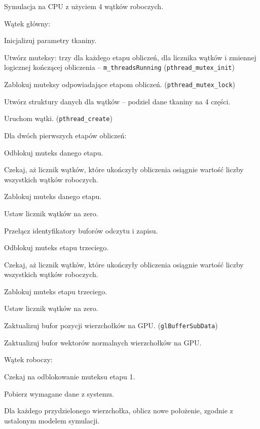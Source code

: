 		\begin{algorithm}
			\label{alg_5_3}
			\caption{Symulacja na CPU z użyciem 4 wątków roboczych.}	
			Wątek główny:
			
			\Indp
			
			Inicjalizuj parametry tkaniny.
			
			Utwórz muteksy: trzy dla każdego etapu obliczeń, dla licznika wątków i zmiennej logicznej kończącej obliczenia -- \texttt{m\_threadsRunning} (\texttt{pthread\_mutex\_init})
			
			Zablokuj muteksy odpowiadające etapom obliczeń. (\texttt{pthread\_mutex\_lock})
			
			Utwórz struktury danych dla wątków -- podziel dane tkaniny na 4 części.
			
			Uruchom wątki. (\texttt{pthread\_create})
			
			{
				Dla dwóch pierwszych etapów obliczeń:
				
				\Indp
					Odblokuj muteks danego etapu.
					
					Czekaj, aż licznik wątków, które ukończyły obliczenia osiągnie wartość liczby wszystkich wątków roboczych.
					
					Zablokuj muteks danego etapu.
					
					Ustaw licznik wątków na zero.
					
					Przełącz identyfikatory buforów odczytu i zapisu.
				\Indm
				
				Odblokuj muteks etapu trzeciego.
				
				Czekaj, aż licznik wątków, które ukończyły obliczenia osiągnie wartość liczby wszystkich wątków roboczych.
				
				Zablokuj muteks etapu trzeciego.
				
				Ustaw licznik wątków na zero.
				
				Zaktualizuj bufor pozycji wierzchołków na GPU. (\texttt{glBufferSubData})
				
				Zaktualizuj bufor wektorów normalnych wierzchołków na GPU.
			}
			
			\Indm
			
			Wątek roboczy:
			
			\Indp
			
			{
				Czekaj na odblokowanie muteksu etapu 1.
				
				Pobierz wymagane dane z systemu.
				
				Dla każdego przydzielonego wierzchołka, oblicz nowe położenie, zgodnie z ustalonym modelem symulacji.
				
}
\end{algorithm}

